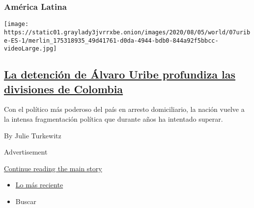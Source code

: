 \begin{enumerate}
{  \subsubsection{América Latina}\label{amuxe9rica-latina-2}}

  \texttt{[image: https://static01.graylady3jvrrxbe.onion/images/2020/08/05/world/07uribe-ES-1/merlin\_175318935\_49d41761-d0da-4944-bdb0-844a92f5bbcc-videoLarge.jpg]}

  \hypertarget{la-detenciuxf3n-de-uxe1lvaro-uribe-profundiza-las-divisiones-de-colombia}{%
  \subsection{\texorpdfstring{\href{/es/2020/08/07/espanol/america-latina/alvaro-uribe-colombia.html}{La
  detención de Álvaro Uribe profundiza las divisiones de
  Colombia}}{La detención de Álvaro Uribe profundiza las divisiones de Colombia}}\label{la-detenciuxf3n-de-uxe1lvaro-uribe-profundiza-las-divisiones-de-colombia}}

  Con el político más poderoso del país en arresto domiciliario, la
  nación vuelve a la intensa fragmentación política que durante años ha
  intentado superar.

  By Julie Turkewitz
\end{enumerate}

Advertisement

\protect\hyperlink{after-mid1}{Continue reading the main story}

\begin{itemize}
\tightlist
\item
  \protect\hyperlink{stream-panel}{Lo más reciente}
\item
  Buscar
\end{itemize}

